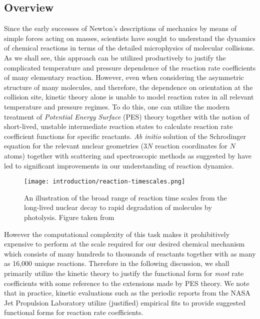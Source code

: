 \subsection{Overview}

Since the early successes of Newton's descriptions of mechanics by means of simple forces acting on masses, scientists have sought to understand the dynamics of chemical reactions in terms of the detailed microphysics of molecular collisions. As we shall see, this approach can be utilized productively to justify the complicated temperature and pressure dependence of the reaction rate coefficients of many elementary reaction. However, even when considering the asymmetric structure of many molecules, and therefore, the dependence on orientation at the collision site, kinetic theory alone is unable to model reaction rates in all relevant temperature and pressure regimes. To do this, one can utilize the modern treatment of \textit{Potential Energy Surface} (PES) theory together with the notion of short-lived, unstable intermediate reaction states to calculate reaction rate coefficient functions for specific reactants. \textit{Ab initio} solution of the Schrodinger equation for the relevant nuclear geometries ($3N$ reaction coordinates for $N$ atoms) together with scattering and spectroscopic methods as suggested by \cite{transition-state-spectroscopy-bimol} have led to significant improvements in our understanding of reaction dynamics.


\begin{figure}[h]
  \centering
  \texttt{[image: introduction/reaction-timescales.png]}
  \caption{An illustration of the broad range of reaction time scales from the long-lived nuclear decay to rapid degradation of molecules by photolysis. Figure taken from \cite{arnaut2006chemical}}
  \label{fig:reaction-timescales}
\end{figure}


However the computational complexity of this task makes it prohibitively expensive to perform at the scale required for our desired chemical mechanism which consists of many hundreds to thousands of reactants together with as many as 16,000 unique reactions. Therefore in the following discussion, we shall primarily utilize the kinetic theory to justify the functional form for \textit{most} rate coefficients with some reference to the extensions made by PES theory. We note that in practice, kinetic evaluations such as the periodic reports from the NASA Jet Propulsion Laboratory \cite{jpl-kinetic-evaluation-2020} utilize (justified) empirical fits to provide suggested functional forms for reaction rate coefficients.

